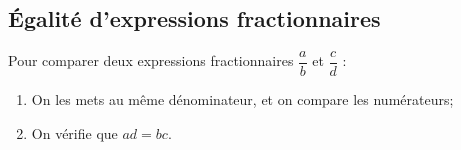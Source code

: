 \documentclass{article}
\begin{document}
\subsection{Égalité d'expressions fractionnaires}
\begin{remark}
Pour comparer deux expressions fractionnaires $\dfrac{a}{b}$ et $\dfrac{c}{d}$ :
\begin{enumerate}
\item On les mets au même dénominateur, et on compare les numérateurs;
\item On vérifie que $ad = bc$. 
\end{enumerate}
\end{remark}
\end{document}
